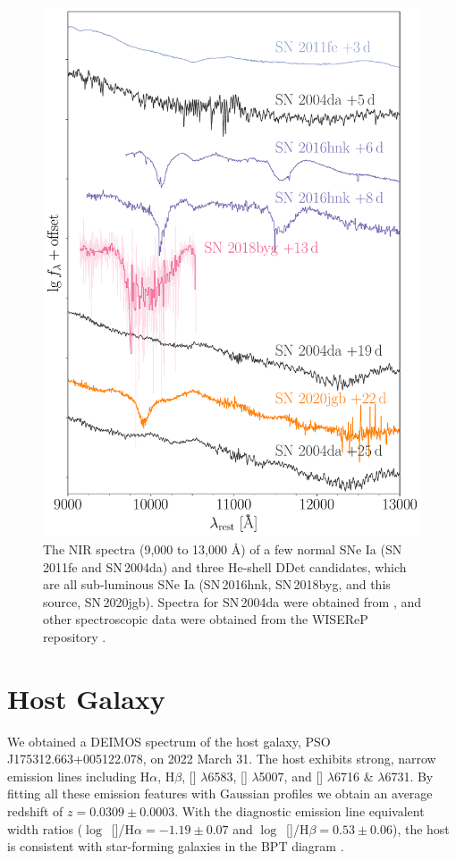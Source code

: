 \documentclass[twocolumn]{aastex631}
\newcommand{\sn}{SN\,2020jgb}
\begin{document}
\begin{figure}
    \centering
    \includegraphics[width=\linewidth]{NIR_spec_comp.pdf}
    \caption{The NIR spectra (9,000 to 13,000 \AA) of a few normal SNe Ia (SN\,2011fe and SN\,2004da) and three He-shell DDet candidates, which are all sub-luminous SNe Ia (SN\,2016hnk, SN\,2018byg, and this source, \sn). Spectra for SN\,2004da were obtained from \citet{Marion2009_NIR}, and other spectroscopic data were obtained from the WISEReP repository \citep{wiserep_2012}.}
    \label{fig:NIR_comp}
\end{figure}

\section{Host Galaxy} \label{sec:host}
We obtained a DEIMOS spectrum of the host galaxy, PSO J175312.663+005122.078, on 2022 March 31. The host exhibits strong, narrow emission lines including H$\alpha$, H$\beta$, [] $\lambda$6583, [] $\lambda$5007, and [] $\lambda$6716 \& $\lambda$6731. By fitting all these emission features with Gaussian profiles we obtain an average redshift of $z=0.0309\pm0.0003$. With the diagnostic emission line equivalent width ratios ($\log$~[]/H$\alpha=-1.19\pm0.07$ and $\log$~[]/H$\beta=0.53\pm0.06$), the host is consistent with star-forming galaxies in the BPT diagram \citep{BPT_1981, Veilleux_1987}.
\end{document}
